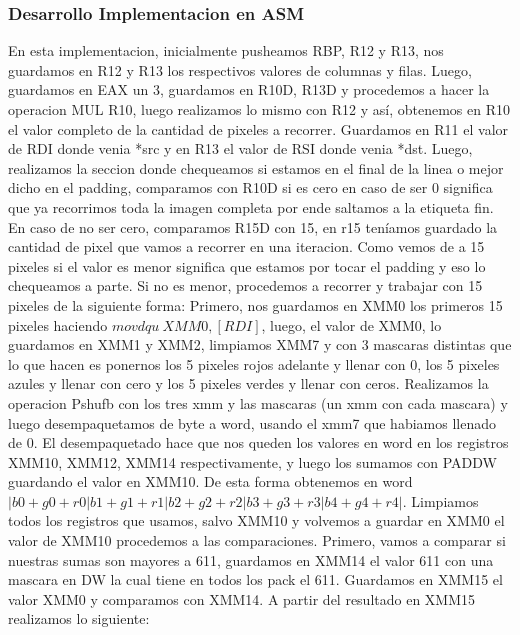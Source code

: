 \vspace*{0.3cm} \noindent
\subsubsection{Desarrollo Implementacion en ASM}
En esta implementacion, inicialmente pusheamos RBP, R12 y R13, nos guardamos en R12 y R13 los respectivos valores de columnas y filas.\newline
Luego, guardamos en EAX un 3, guardamos en R10D, R13D y procedemos a hacer la operacion MUL R10, luego realizamos lo mismo con R12 y así,
obtenemos en R10 el valor completo de la cantidad de pixeles a recorrer.\newline
Guardamos en R11 el valor de RDI donde venia *src y en R13 el valor de RSI donde venia *dst. \newline
Luego, realizamos la seccion donde chequeamos si estamos en el final de la linea o mejor dicho en el padding, comparamos con R10D si es cero \newline
en caso de ser 0 significa que ya recorrimos toda la imagen completa por ende saltamos a la etiqueta fin. \newline
En caso de no ser cero, comparamos R15D con 15, en r15 teníamos guardado la cantidad de pixel que vamos a recorrer en una iteracion.
Como vemos de a 15 pixeles si el valor es menor significa que estamos por tocar el padding y eso lo chequeamos a parte. \newline
Si no es menor, procedemos a recorrer y trabajar con 15 pixeles de la siguiente forma: \newline
Primero, nos guardamos en XMM0 los primeros 15 pixeles haciendo $ movdqu\  XMM0, [RDI]$, luego, el valor de XMM0,
lo guardamos en XMM1 y XMM2, limpiamos XMM7 y con 3 mascaras distintas que lo que hacen es ponernos los 5 pixeles rojos adelante y llenar con 0, 
los 5 pixeles azules y llenar con cero y los 5 pixeles verdes y llenar con ceros. \newline
Realizamos la operacion Pshufb con los tres xmm y las mascaras (un xmm con cada mascara) y luego desempaquetamos de byte a word,
usando el xmm7 que habiamos llenado de 0. \newline
El desempaquetado hace que nos queden los valores en word en los registros XMM10, XMM12, XMM14 respectivamente, y luego
los sumamos con PADDW guardando el valor en XMM10. De esta forma obtenemos en word 
$|b0 + g0 + r0|b1 + g1 + r1|b2 + g2 + r2|b3 + g3 + r3|b4 + g4 + r4|$. \newline
Limpiamos todos los registros que usamos, salvo XMM10 y volvemos a guardar en XMM0 el valor de XMM10 procedemos a las comparaciones.
Primero, vamos a comparar si nuestras sumas son mayores a 611, guardamos en XMM14 el valor 611 con una mascara en DW la cual tiene en todos los pack
el 611. Guardamos en XMM15 el valor XMM0 y comparamos con XMM14.
A partir del resultado en XMM15 realizamos lo siguiente:\newline


